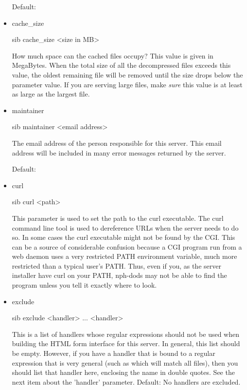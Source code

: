 \documentclass{dods-book}
\begin{document}
\begin{itemize}
Default: 

\item cache\_size

\begin{vcode}{sib}
  cache_size <size in MB>
\end{vcode}

How much space can the cached files occupy? This value is given in
MegaBytes. When the total size of all the decompressed files exceeds
this value, the oldest remaining file will be removed until the size
drops below the parameter value. If you are serving large files, make
\emph{sure} this value is at least as large as the largest file.

\item maintainer

\begin{vcode}{sib}
  maintainer <email address>
\end{vcode}

The email address of the person responsible for this server. This
email address will be included in many error messages returned by the
server.

Default: 

\item curl

\begin{vcode}{sib}
  curl <path>
\end{vcode}

This parameter is used to set the path to the curl executable. The
curl command line tool is used to dereference URLs when the server
needs to do so. In some cases the curl executable might not be found
by the CGI. This can be a source of considerable confusion because a
CGI program run from a web daemon uses a very restricted PATH
environment variable, much more restricted than a typical user's PATH.
Thus, even if you, as the server installer have curl on your PATH,
nph-dods may not be able to find the program unless you tell it
exactly where to look.

\item exclude

\begin{vcode}{sib}
  exclude <handler> ... <handler>
\end{vcode}

This is a list of handlers whose regular expressions should not be
used when building the HTML form interface for this server. In
general, this list should be empty. However, if you have a handler
that is bound to a regular expression that is very general (such as
 which will match all files), then you should list that
handler here, enclosing the name in double quotes. See the next item
about the 'handler' parameter. Default: No handlers are
excluded.


\end{itemize}
\end{document}
